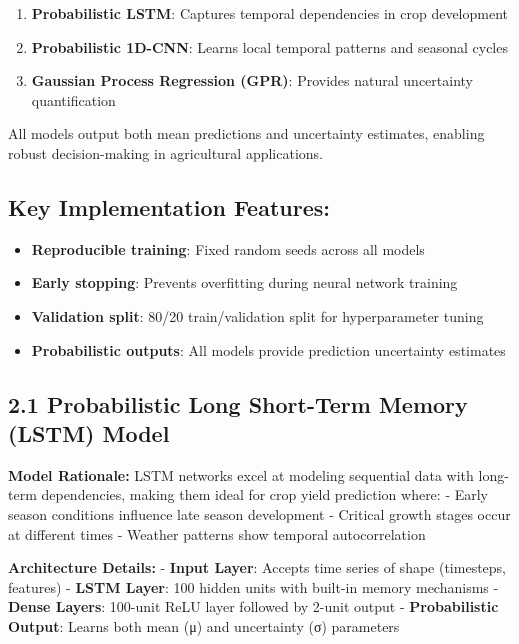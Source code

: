 \documentclass[
  letterpaper,
  DIV=11,
  numbers=noendperiod]{scrreprt}
\providecommand{\tightlist}{%
  \setlength{\itemsep}{0pt}\setlength{\parskip}{0pt}}\usepackage{longtable,booktabs,array}
\begin{document}
\begin{enumerate}
\def\labelenumi{\arabic{enumi}.}
\tightlist
\item
  \textbf{Probabilistic LSTM}: Captures temporal dependencies in crop
  development
\item
  \textbf{Probabilistic 1D-CNN}: Learns local temporal patterns and
  seasonal cycles
\item
  \textbf{Gaussian Process Regression (GPR)}: Provides natural
  uncertainty quantification
\end{enumerate}

All models output both mean predictions and uncertainty estimates,
enabling robust decision-making in agricultural applications.

\subsection{Key Implementation
Features:}\label{key-implementation-features}

\begin{itemize}
\tightlist
\item
  \textbf{Reproducible training}: Fixed random seeds across all models
\item
  \textbf{Early stopping}: Prevents overfitting during neural network
  training
\item
  \textbf{Validation split}: 80/20 train/validation split for
  hyperparameter tuning
\item
  \textbf{Probabilistic outputs}: All models provide prediction
  uncertainty estimates
\end{itemize}

\subsection{2.1 Probabilistic Long Short-Term Memory (LSTM)
Model}\label{probabilistic-long-short-term-memory-lstm-model}

\textbf{Model Rationale:} LSTM networks excel at modeling sequential
data with long-term dependencies, making them ideal for crop yield
prediction where: - Early season conditions influence late season
development - Critical growth stages occur at different times - Weather
patterns show temporal autocorrelation

\textbf{Architecture Details:} - \textbf{Input Layer}: Accepts time
series of shape (timesteps, features) - \textbf{LSTM Layer}: 100 hidden
units with built-in memory mechanisms - \textbf{Dense Layers}: 100-unit
ReLU layer followed by 2-unit output - \textbf{Probabilistic Output}:
Learns both mean (μ) and uncertainty (σ) parameters
\end{document}
